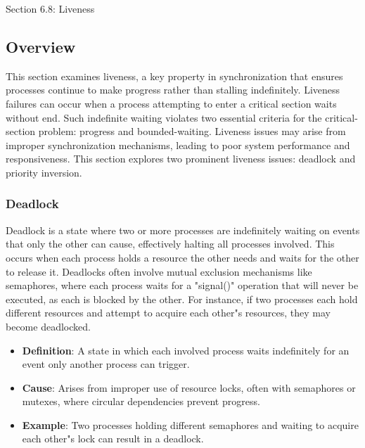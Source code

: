 \begin{notes}{Section 6.8: Liveness}
    \subsection*{Overview}

    This section examines liveness, a key property in synchronization that ensures processes continue to make progress rather than stalling indefinitely. Liveness failures can occur when a process 
    attempting to enter a critical section waits without end. Such indefinite waiting violates two essential criteria for the critical-section problem: progress and bounded-waiting. Liveness issues 
    may arise from improper synchronization mechanisms, leading to poor system performance and responsiveness. This section explores two prominent liveness issues: deadlock and priority inversion.
    
    \subsubsection*{Deadlock}
    
    Deadlock is a state where two or more processes are indefinitely waiting on events that only the other can cause, effectively halting all processes involved. This occurs when each process holds a 
    resource the other needs and waits for the other to release it. Deadlocks often involve mutual exclusion mechanisms like semaphores, where each process waits for a "signal()" operation that will 
    never be executed, as each is blocked by the other. For instance, if two processes each hold different resources and attempt to acquire each other"s resources, they may become deadlocked.
    
    \begin{highlight}[Deadlock]
    
        \begin{itemize}
            \item \textbf{Definition}: A state in which each involved process waits indefinitely for an event only another process can trigger.
            \item \textbf{Cause}: Arises from improper use of resource locks, often with semaphores or mutexes, where circular dependencies prevent progress.
            \item \textbf{Example}: Two processes holding different semaphores and waiting to acquire each other"s lock can result in a deadlock.
        \end{itemize}
    

\end{highlight}
\end{notes}
